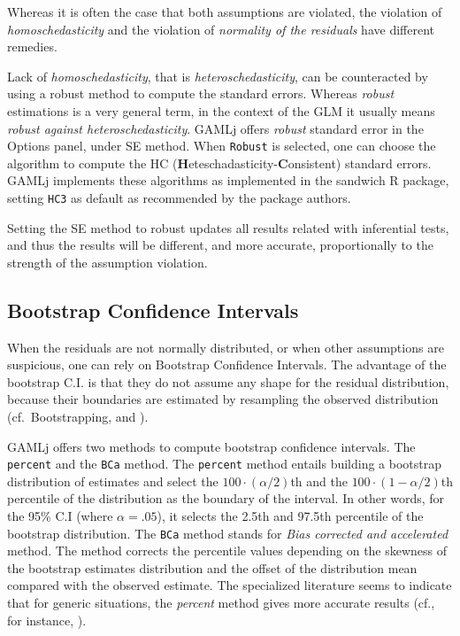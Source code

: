 \documentclass[
]{book}
\begin{document}
Whereas it is often the case that both assumptions are violated, the violation of \emph{homoschedasticity} and the violation of \emph{normality of the residuals} have different remedies.

Lack of \emph{homoschedasticity}, that is \emph{heteroschedasticity}, can be counteracted by using a robust method to compute the standard errors. Whereas \emph{robust} estimations is a very general term, in the context of the GLM it usually means \emph{robust against heteroschedasticity}. {GAMLj} offers \emph{robust} standard error in the {Options} panel, under {SE method}. When \texttt{Robust} is selected, one can choose the algorithm to compute the HC (\textbf{H}eteschadasticity-\textbf{C}onsistent) standard errors. {GAMLj} implements these algorithms as implemented in the sandwich R package, setting \texttt{HC3} as default as recommended by the package authors.

Setting the SE method to robust updates all results related with inferential tests, and thus the results will be different, and more accurate, proportionally to the strength of the assumption violation.

\hypertarget{bootstrap-confidence-intervals}{%
\subsection{Bootstrap Confidence Intervals}\label{bootstrap-confidence-intervals}}

When the residuals are not normally distributed, or when other assumptions are suspicious,
one can rely on Bootstrap Confidence Intervals. The advantage of the bootstrap C.I. is that they do not assume any shape for the residual distribution, because their boundaries are estimated by resampling the observed distribution (cf.~Bootstrapping, and \citet{efron1994introduction}).

{GAMLj} offers two methods to compute bootstrap confidence intervals. The \texttt{percent} and the \texttt{BCa} method. The \texttt{percent} method entails building a bootstrap distribution of estimates and select the \(100 \cdot (\alpha/2)\)th and the \(100 \cdot (1-{\alpha /2})\)th percentile of the distribution as the boundary of the interval. In other words, for the 95\% C.I (where \(\alpha=.05\)), it selects the 2.5th and 97.5th percentile of the bootstrap distribution. The \texttt{BCa} method stands for \emph{Bias corrected and accelerated} method. The method corrects the percentile values depending on the skewness of the bootstrap estimates distribution and the offset of the distribution mean compared with the observed estimate. The specialized literature seems to indicate that for generic situations, the \emph{percent} method gives more accurate results (cf., for instance, \citet{jung2019comparison}).
\end{document}
